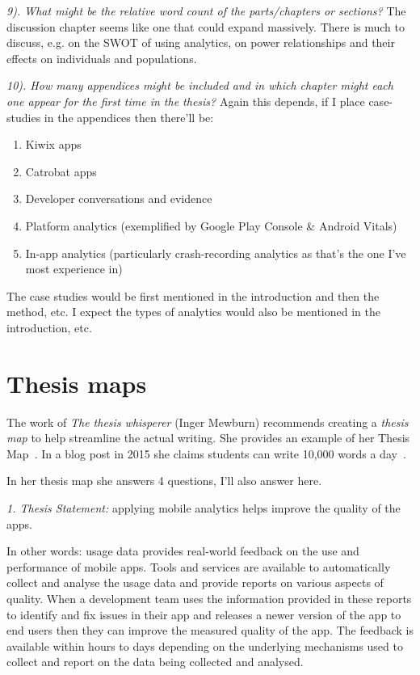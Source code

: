 \emph{9). What might be the relative word count of the parts/chapters or
sections?}
The discussion chapter seems like one that could expand massively. There is much to discuss, e.g. on the SWOT of using analytics, on power relationships and their effects on individuals and populations. 

\emph{10). How many appendices might be included and in which chapter
might each one appear for the first time in the thesis?}
Again this depends, if I place case-studies in the appendices then there'll be:
\begin{enumerate}
    \item Kiwix apps
    \item Catrobat apps
    \item Developer conversations and evidence
    \item Platform analytics (exemplified by Google Play Console \& Android Vitals)
    \item In-app analytics (particularly crash-recording analytics as that's the one I've most experience in)
\end{enumerate}
The case studies would be first mentioned in the introduction and then the method, etc. I expect the types of analytics would also be mentioned in the introduction, etc.

\section{Thesis maps}
The work of \emph{The thesis whisperer} (Inger Mewburn) recommends creating a \emph{thesis map} to help streamline the actual writing. She provides an example of her Thesis Map~\cite{thesis_map_example_inger_mewburn}. In a blog post in 2015 she claims students can write 10,000 words a day~\cite{how_to_write_10k_words_day}.

In her thesis map she answers 4 questions, I'll also answer here.

\vspace{3mm}
\emph{1. Thesis Statement: } applying mobile analytics helps improve the quality of the apps. 

In other words: usage data provides real-world feedback on the use and performance of mobile apps. Tools and services are available to automatically collect and analyse the usage data and provide reports on various aspects of quality. When a development team uses the information provided in these reports to identify and fix issues in their app and releases a newer version of the app to end users then they can improve the measured quality of the app. The feedback is available within hours to days depending on the underlying mechanisms used to collect and report on the data being collected and analysed.

